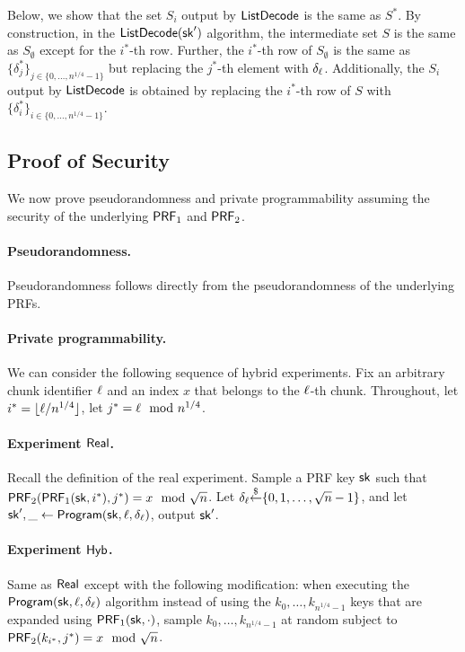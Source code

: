 Below, we show that the set $S_i$ output by ${\sf ListDecode}$
is the same as $S^*$.
By %
construction, 
in the ${\sf ListDecode}(\mathsf{sk}')$
algorithm, the intermediate set $S$ 
is the same as $S_{\emptyset}$
except for the $i^*$-th row.
Further, the $i^*$-th row of $S_\emptyset$
is the same as 
$\{\delta^*_j\}_{j\in \{0, \ldots, n^{1/4}-1\}}$
but replacing the $j^*$-th element
with $\delta_\ell$. %
Additionally, the $S_i$ output 
by ${\sf ListDecode}$ is obtained by replacing
the $i^*$-th row of $S$ with 
$\{\delta^*_i\}_{i\in \{0, \ldots, n^{1/4}-1\}}$.








\subsection{Proof of Security}
We now prove pseudorandomness and private programmability
assuming the security of the underlying $\mathsf{PRF}_1$ and $\mathsf{PRF}_2$.

\paragraph{Pseudorandomness.}
Pseudorandomness follows directly from the pseudorandomness
of the underlying PRFs.

\paragraph{Private programmability.}
We can consider the following sequence of hybrid experiments.
Fix an arbitrary chunk identifier $\ell$
and an index $x$ that belongs to the $\ell$-th chunk.
Throughout, let $i^* = \lfloor \ell/n^{1/4} \rfloor$, let
$j^* = \ell \mod n^{1/4}$.

\paragraph{Experiment ${\sf Real}$.}
Recall the definition of the real experiment.
Sample a PRF key $\mathsf{sk}$ such that 
$\mathsf{PRF}_2(\mathsf{PRF}_1(\mathsf{sk}, i^*), j^*) = x \mod \sqrt{n}$.
Let $\delta_\ell {\overset{\$}{\leftarrow}} \{0, 1, \ldots, \sqrt{n}-1\}$,  
and let $\mathsf{sk}', \_ \leftarrow {\sf Program}(\mathsf{sk}, \ell, \delta_\ell)$, 
output $\mathsf{sk}'$.

\paragraph{Experiment ${\sf Hyb}$.}
Same as ${\sf Real}$ except with the following modification: 
when executing the ${\sf Program}(\mathsf{sk}, \ell, \delta_\ell)$ 
algorithm
instead of using the $k_0, \ldots, k_{n^{1/4}-1}$
keys that are expanded using $\mathsf{PRF}_1(\mathsf{sk}, \cdot)$, 
sample 
$k_0, \ldots, k_{n^{1/4}-1}$
at random subject to 
$\mathsf{PRF}_2(k_{i^*}, j^*) = x \mod \sqrt{n}$.

